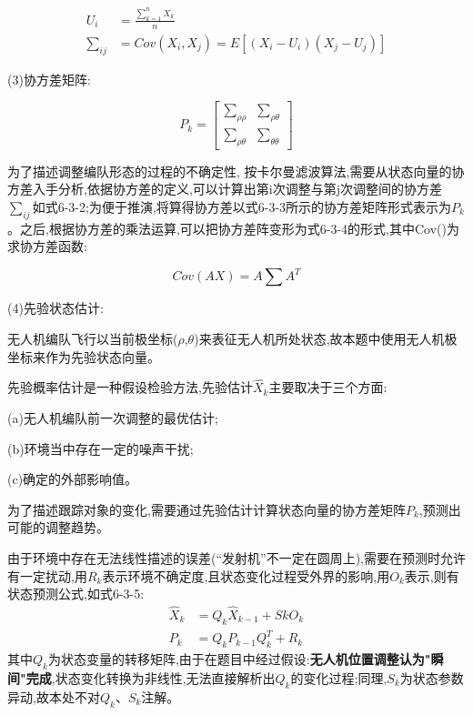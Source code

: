 \documentclass[withoutpreface,bwprint]{cumcmthesis} %
\begin{document}
			    				\begin{equation}
			    					\tag{6-3-2}
			    				\begin{split}
			    					U_{i} & = \frac{\sum_{k=1}^{n} X_{k}}{n} \\
			    					\sum_{ij} & = Cov(X_{i},X_{j}) = E[(X_{i}-U_{i})(X_{j}-U_{j})]
			    				\end{split}
			    			\end{equation}
    							
    					(3)协方差矩阵:
    					
    					\begin{equation}
    							\tag{6-3-3}
	    						P_{k} =	\begin{bmatrix}
    							\sum_{\rho\rho} &\sum_{\rho\theta} \\
    							\sum_{\rho\theta} & \sum_{\theta\theta}
    							\end{bmatrix}
    						\end{equation}
    						
    					为了描述调整编队形态的过程的不确定性, 按卡尔曼滤波算法,需要从状态向量的协方差入手分析,依据协方差的定义,可以计算出第i次调整与第j次调整间的协方差$\sum_{ij}$如式6-3-2;为便于推演,将算得协方差以式6-3-3所示的协方差矩阵形式表示为$P_{k}$。之后,根据协方差的乘法运算,可以把协方差阵变形为式6-3-4的形式,其中Cov()为求协方差函数:
    					
    						\begin{equation}
    							\tag{6-3-4}
    							Cov(AX) = A\sum A^{T}
 					     	\end{equation}
 				     	
    					(4)先验状态估计:
    					
    					无人机编队飞行以当前极坐标($\rho$,$\theta$)来表征无人机所处状态,故本题中使用无人机极坐标来作为先验状态向量。
    					
    					先验概率估计是一种假设检验方法,先验估计$\hat{X_{k}}$主要取决于三个方面:
    					
    					\qquad	(a)无人机编队前一次调整的最优估计;
    					
    					\qquad (b)环境当中存在一定的噪声干扰;
    					
    					\qquad (c)确定的外部影响值。
    					
    					为了描述跟踪对象的变化,需要通过先验估计计算状态向量的协方差矩阵$P_{k}$,预测出可能的调整趋势。
    					
    					由于环境中存在无法线性描述的误差(“发射机”不一定在圆周上),需要在预测时允许有一定扰动,用$R_{k}$表示环境不确定度,且状态变化过程受外界的影响,用$O_{k}$表示,则有状态预测公式,如式6-3-5:
    					\begin{equation}
    						\tag{6-3-5}
    						\begin{split}
    						\hat{X}_{k} &=Q_{k} \hat{X}_{k-1} + S{k}O_{k}\\
    						P_{k} &=Q_{k} P_{k-1}Q_{k}^{T} + R_{k}
    						\end{split}
    					\end{equation}	
    					其中$Q_{k}$为状态变量的转移矩阵,由于在题目中经过假设:\textbf{无人机位置调整认为"瞬间"完成},状态变化转换为非线性,无法直接解析出$Q_{k}$的变化过程;同理,$S_{k}$为状态参数异动,故本处不对$Q_{k}$、$S_{k}$注解。
    					
\end{document}
